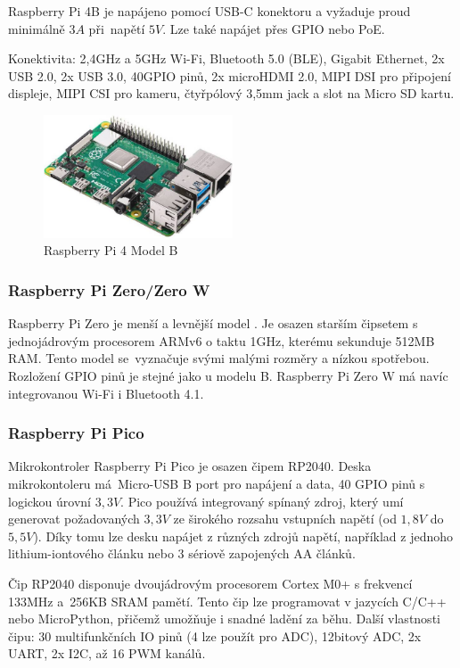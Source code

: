 Raspberry Pi 4B je napájeno pomocí USB-C konektoru a vyžaduje proud minimálně $3A$ při~napětí $5V$. Lze také napájet přes GPIO nebo PoE.

Konektivita: 2,4GHz a 5GHz Wi-Fi, Bluetooth 5.0 (BLE), Gigabit Ethernet, 2x USB 2.0, 2x USB 3.0, 40GPIO pinů, 2x microHDMI 2.0, MIPI DSI pro připojení displeje, MIPI CSI pro kameru, čtyřpólový 3,5mm jack a slot na Micro SD kartu.

\begin{figure}[hbt]
	\centering
	\includegraphics[width=0.5\textwidth]{obrazky-figures/rpi4b.jpg}
	\caption[raspberry]{Raspberry Pi 4 Model B\footnotemark}
	\label{rpi4b}
\end{figure}


\subsubsection*{Raspberry Pi Zero/Zero W}
Raspberry Pi Zero je menší a levnější model \cite{rpiZero}. Je osazen starším čipsetem s jednojádrovým procesorem ARMv6 o taktu 1GHz, kterému sekunduje 512MB RAM. Tento model se~vyznačuje svými malými rozměry a nízkou spotřebou. Rozložení GPIO pinů je stejné jako u modelu B. Raspberry Pi Zero W má navíc integrovanou Wi-Fi i Bluetooth 4.1.

\subsubsection*{Raspberry Pi Pico}
Mikrokontroler Raspberry Pi Pico \cite{rpiPico} je osazen čipem RP2040. Deska mikrokontoleru má~Micro-USB B port pro napájení a data, 40 GPIO pinů s logickou úrovní $3,3V$. Pico používá integrovaný spínaný zdroj, který umí generovat požadovaných $3,3V$ ze širokého rozsahu vstupních napětí (od $1,8V$ do $5,5V$). Díky tomu lze desku napájet z různých zdrojů napětí, například z jednoho lithium-iontového článku nebo 3 sériově zapojených AA článků.

Čip RP2040 disponuje dvoujádrovým procesorem Cortex M0+ s frekvencí 133MHz a~256KB SRAM pamětí. Tento čip lze programovat v jazycích C/C++ nebo MicroPython, přičemž umožňuje i snadné ladění za běhu. Další vlastnosti čipu: 30 multifunkčních IO pinů (4 lze použít pro ADC), 12bitový ADC, 2x UART, 2x I2C, až 16 PWM kanálů.



